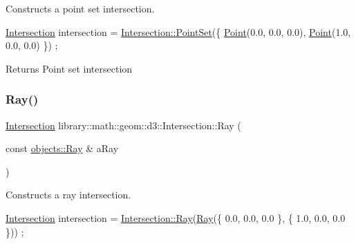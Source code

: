 Constructs a point set intersection. 


\begin{DoxyCode}
\hyperlink{classlibrary_1_1math_1_1geom_1_1d3_1_1_intersection_afbaef540a058ccc7e58f1be2585304a9}{Intersection} intersection = \hyperlink{classlibrary_1_1math_1_1geom_1_1d3_1_1_intersection_a562d64d802f6fcd181f1122393642605}{Intersection::PointSet}(\{ 
      \hyperlink{classlibrary_1_1math_1_1geom_1_1d3_1_1_intersection_a5155cc245bd2bf96a4296b0a8319c709}{Point}(0.0, 0.0, 0.0), \hyperlink{classlibrary_1_1math_1_1geom_1_1d3_1_1_intersection_a5155cc245bd2bf96a4296b0a8319c709}{Point}(1.0, 0.0, 0.0) \}) ;
\end{DoxyCode}


\begin{DoxyReturn}{Returns}
Point set intersection 
\end{DoxyReturn}
\mbox{\label{classlibrary_1_1math_1_1geom_1_1d3_1_1_intersection_a1a1ca8a76e8d4ea2cd9435268b5a87d1}} 
\subsubsection{\texorpdfstring{Ray()}{Ray()}}
{\footnotesize\ttfamily \hyperlink{classlibrary_1_1math_1_1geom_1_1d3_1_1_intersection}{Intersection} library\+::math\+::geom\+::d3\+::\+Intersection\+::\+Ray (\begin{DoxyParamCaption}\item[{const \hyperlink{classlibrary_1_1math_1_1geom_1_1d3_1_1objects_1_1_ray}{objects\+::\+Ray} \&}]{a\+Ray }\end{DoxyParamCaption})\hspace{0.3cm}{\ttfamily [static]}}



Constructs a ray intersection. 


\begin{DoxyCode}
\hyperlink{classlibrary_1_1math_1_1geom_1_1d3_1_1_intersection_afbaef540a058ccc7e58f1be2585304a9}{Intersection} intersection = \hyperlink{classlibrary_1_1math_1_1geom_1_1d3_1_1_intersection_a1a1ca8a76e8d4ea2cd9435268b5a87d1}{Intersection::Ray}(\hyperlink{classlibrary_1_1math_1_1geom_1_1d3_1_1_intersection_a1a1ca8a76e8d4ea2cd9435268b5a87d1}{Ray}(\{ 0.0, 0.0, 0.0 \}, \{ 1.0,
       0.0, 0.0 \})) ;
\end{DoxyCode}



